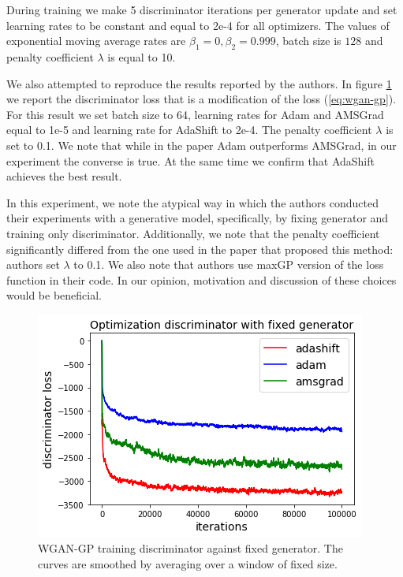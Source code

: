 \documentclass{article} %
\begin{document}
During training we make 5 discriminator iterations
per generator update and set learning rates to be constant
and equal to 2e-4 for all optimizers. The values of
exponential moving average rates are $\beta_1 = 0,
\beta_2 = 0.999$, batch size is $128$ and penalty
coefficient $\lambda$ is equal to 10.

We also attempted to reproduce the results reported by the authors.
In figure \ref{fig:wgan-fixed-generator} we report the discriminator
loss that is a modification of the loss (\ref{eq:wgan-gp}). For
this result we set batch size to 64, learning rates for Adam and AMSGrad equal to 1e-5 and learning rate for AdaShift to 2e-4. The penalty coefficient $\lambda$ is set to 0.1. We note that while in the paper Adam outperforms AMSGrad, in our experiment the converse is true. At the same time we confirm that AdaShift achieves the best result.

In this experiment, we note the atypical way in which the authors conducted their experiments with a generative model, specifically, by fixing generator and training only discriminator. Additionally, we note that the penalty coefficient significantly differed from the one used in the paper that proposed this method: authors set $\lambda$ to
0.1. We also note that authors use maxGP version of the loss function in their code. In our opinion, motivation and discussion of these choices would be beneficial.


\begin{figure}[t]
\centering
\includegraphics[width=.52\linewidth]{discriminator_fixed_gen.png}
\caption{WGAN-GP training discriminator against fixed generator. The curves are smoothed by averaging over a window of fixed size. }\label{fig:wgan-fixed-generator}
\end{figure}
\end{document}
